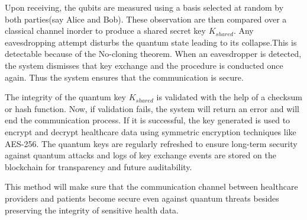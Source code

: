 \documentclass[pdflatex,sn-mathphys-num]{sn-jnl}%
\theoremstyle{thmstyleone}%
\theoremstyle{thmstyletwo}%
\theoremstyle{thmstylethree}%
\begin{document}
Upon receiving, the qubits are measured using a basis selected at random by both parties(say Alice and Bob). These observation are then compared over a classical channel inorder to produce a shared secret key \( K_{shared} \)\cite{bib21}. Any eavesdropping attempt disturbs the quantum state leading to its collapse.This is detectable because of the No-cloning theorem\cite{bib11}. When an eavesdropper is detected, the system dismisses that key exchange and the procedure is conducted once again. Thus the system ensures that the communication is secure.

The integrity of the quantum key \( K_{shared} \) is validated with the help of a checksum or hash function. Now, if validation fails, the system will return an error and will end the communication process. If it is successful, the key generated is used to encrypt and decrypt healthcare data using symmetric encryption techniques like AES-256\cite{bib22}. The quantum keys are regularly refreshed to ensure long-term security against quantum attacks and logs of key exchange events are stored on the blockchain for transparency and future auditability.

This method will make sure that the communication channel between healthcare providers and patients become secure even against quantum threats besides preserving the integrity of sensitive health data.




\end{document}
